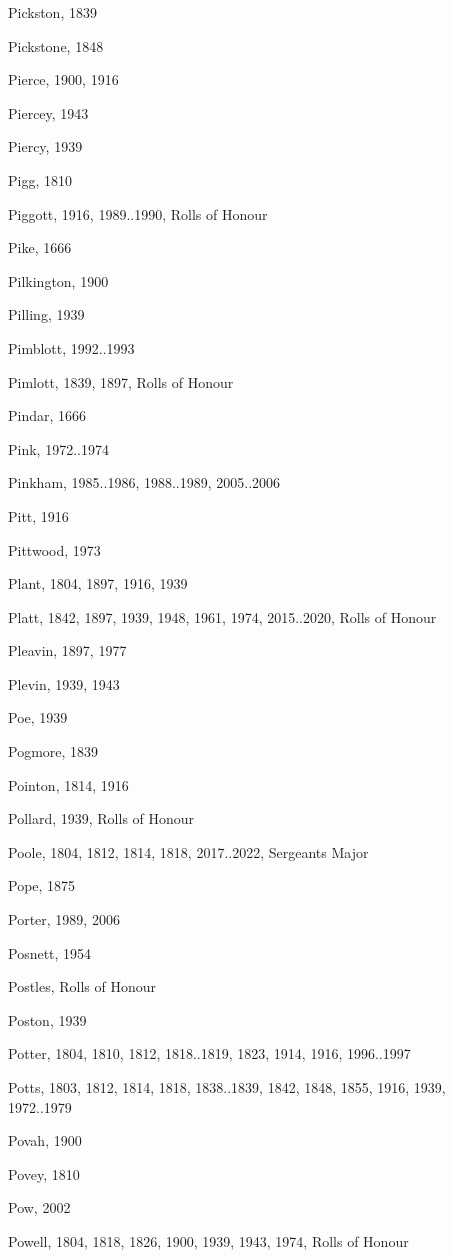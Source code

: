 {\begin{theindex}
\item Pickston, 1839
\item Pickstone, 1848
\item Pierce, 1900, 1916
\item Piercey, 1943
\item Piercy, 1939
\item Pigg, 1810
\item Piggott, 1916, 1989..1990, Rolls of Honour
\item Pike, 1666
\item Pilkington, 1900
\item Pilling, 1939
\item Pimblott, 1992..1993
\item Pimlott, 1839, 1897, Rolls of Honour
\item Pindar, 1666
\item Pink, 1972..1974
\item Pinkham, 1985..1986, 1988..1989, 2005..2006
\item Pitt, 1916
\item Pittwood, 1973
\item Plant, 1804, 1897, 1916, 1939
\item Platt, 1842, 1897, 1939, 1948, 1961, 1974, 2015..2020, Rolls of Honour
\item Pleavin, 1897, 1977
\item Plevin, 1939, 1943
\item Poe, 1939
\item Pogmore, 1839
\item Pointon, 1814, 1916
\item Pollard, 1939, Rolls of Honour
\item Poole, 1804, 1812, 1814, 1818, 2017..2022, Sergeants Major
\item Pope, 1875
\item Porter, 1989, 2006
\item Posnett, 1954
\item Postles, Rolls of Honour
\item Poston, 1939
\item Potter, 1804, 1810, 1812, 1818..1819, 1823, 1914, 1916, 1996..1997
\item Potts, 1803, 1812, 1814, 1818, 1838..1839, 1842, 1848, 1855, 1916, 1939, 1972..1979
\item Povah, 1900
\item Povey, 1810
\item Pow, 2002
\item Powell, 1804, 1818, 1826, 1900, 1939, 1943, 1974, Rolls of Honour

\end{theindex}}
